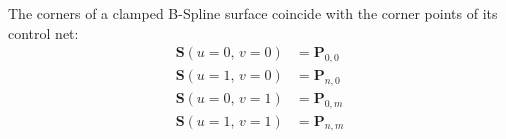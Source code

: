 \begin{enumerate}
    The corners of a clamped B-Spline surface coincide with the corner points of its control net:
    \begin{align*}
        \mathbf{S}(u=0,\, v=0) &= \mathbf{P}_{0, 0} \\
        \mathbf{S}(u=1,\, v=0) &= \mathbf{P}_{n, 0} \\
        \mathbf{S}(u=0,\, v=1) &= \mathbf{P}_{0, m} \\
        \mathbf{S}(u=1,\, v=1) &= \mathbf{P}_{n, m} \\
    \end{align*}
    

    
\end{enumerate}



